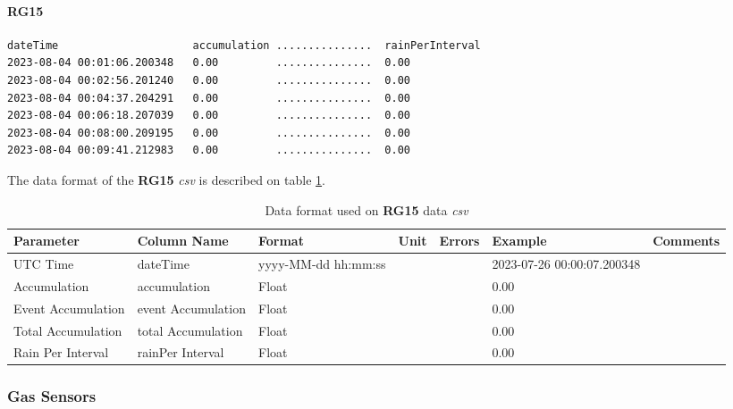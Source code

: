\documentclass[12pt]{article}
\begin{document}
\paragraph{RG15}
    \label{sec:rg15DataFormat}
        {\begin{verbatim}
dateTime                     accumulation ...............  rainPerInterval
2023-08-04 00:01:06.200348   0.00         ...............  0.00
2023-08-04 00:02:56.201240   0.00         ...............  0.00    
2023-08-04 00:04:37.204291   0.00         ...............  0.00   
2023-08-04 00:06:18.207039   0.00         ...............  0.00   
2023-08-04 00:08:00.209195   0.00         ...............  0.00   
2023-08-04 00:09:41.212983   0.00         ...............  0.00   
\end{verbatim} }
         The data format of the \textbf{RG15} \emph{csv} is described on table \ref{t:dataFormatrg15}.
        
        
        \begin{table}[H]
    	\caption{Data format used on \textbf{RG15} data \emph{csv}}
    	 \label{t:dataFormatrg15}
    	\small
    	\begin{tabular}{||p{2cm}| p{2cm}|p{2cm}|p{1.5cm}|p{1.5cm}|p{2cm}|p{2cm}||}
    		\hline
    		\hline
    		Parameter & Column Name & Format & Unit & Errors & Example & Comments \\ 
            \hline
            \hline
    	    UTC Time & dateTime & yyyy-MM-dd hh:mm:ss & & & \tiny 2023-07-26 00:00:07.200348 &  \\
    	    \hline
    		Accumulation & accumulation  & Float & & & 0.00 &  \\
               	\hline
    		Event \hbox{Accumulation} & event \hbox{Accumulation}  & Float & 
                & & 0.00 &  \\
                	\hline
    		Total \hbox{Accumulation} & total \hbox{Accumulation}  & Float & 
                & & 0.00 &   \\
                \hline
    		Rain Per  \hbox{Interval} & rainPer \hbox{Interval}  & Float & 
               & & 0.00 &   \\
               	\hline
    		\hline
    	\end{tabular}
    \end{table}
\clearpage

\subsubsection{Gas Sensors}
\end{document}
